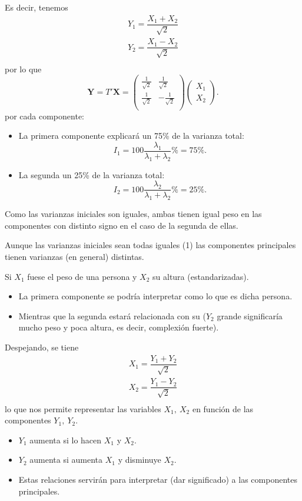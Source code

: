 Es decir, tenemos \[ \begin{array}{l}
	Y_1=\dfrac{X_1+X_2}{\sqrt{2}}\\
	Y_2=\dfrac{X_1-X_2}{\sqrt{2}}\\
\end{array} \]por lo que \[ \mathbf{Y}=T'\mathbf{X}=\begin{pmatrix}
\frac{1}{\sqrt{2}} & \frac{1}{\sqrt{2}}\\
\frac{1}{\sqrt{2}} & -\frac{1}{\sqrt{2}}\\
\end{pmatrix}\begin{pmatrix}
X_1\\
X_2
\end{pmatrix}. \]
 por cada componente:
\begin{itemize}
	\item La primera componente explicará un 75\% de la varianza total: \[ I_1=100\dfrac{\lambda_1}{\lambda_1+\lambda_2}\%=75\%. \]
	\item La segunda un 25\% de la varianza total: \[ I_2=100\dfrac{\lambda_2}{\lambda_1+\lambda_2}\%=25\%. \]
\end{itemize}
Como las varianzas iniciales son iguales, ambas tienen igual peso en las componentes con distinto signo en el caso de la segunda de ellas.

Aunque las varianzas iniciales sean todas iguales (1) las componentes principales tienen varianzas (en general) distintas.

Si $X_1$ fuese el peso de una persona y $X_2$ su altura (estandarizadas).
\begin{itemize}
	\item La primera componente se podría interpretar como lo  que es dicha persona.
	\item Mientras que la segunda estará relacionada con su  ($Y_2$ grande significaría mucho peso y poca altura, es decir, complexión fuerte).
\end{itemize}
Despejando, se tiene \[ \begin{array}{l}
	X_1=\dfrac{Y_1+Y_2}{\sqrt{2}}\\
	X_2=\dfrac{Y_1-Y_2}{\sqrt{2}}\\
\end{array} \] lo que nos permite representar las variables $X_1,\:X_2$ en función de las componentes $Y_1,\:Y_2$.
\begin{itemize}
	\item $Y_1$ aumenta si lo hacen $X_1$ y $X_2$.
	\item $Y_2$ aumenta si aumenta $X_1$ y disminuye $X_2$.
	\item Estas relaciones servirán para interpretar (dar significado) a las componentes principales.
\end{itemize}
